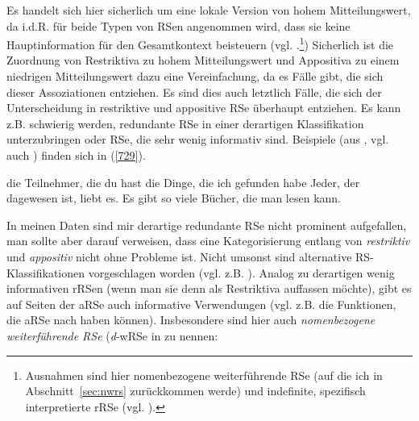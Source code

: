 Es handelt sich hier sicherlich um eine lokale Version von hohem Mitteilungs\-wert, da i.d.R. für beide Typen von RSen angenommen wird, dass sie keine Hauptinformation für den Gesamtkontext beisteuern (vgl. \citealt[38-42]{Antomo2015}.\footnote{Ausnahmen sind hier nomenbezogene weiterführende RSe (auf die ich in Abschnitt~\ref{sec:nwrs} zurückkommen werde) und indefinite, spezifisch interpretierte rRSe (vgl. \citealt[41-42]{Antomo2015}).}) Sicherlich ist die Zuordnung von Restriktiva zu hohem Mitteilungswert und Appositiva zu einem niedrigen Mitteilungswert dazu eine Vereinfachung, da es Fälle gibt, die sich dieser Assoziationen entziehen. Es sind dies auch letztlich Fälle, die sich der Unterscheidung in restriktive und appositive RSe überhaupt entziehen. Es kann z.B. schwierig werden, redundante RSe in einer derartigen Klassifikation unterzubringen oder RSe, die sehr wenig informativ sind. Beispiele (aus \citealt[14/17/33]{Weinert2004}, vgl. auch \citeyear[28-38]{Weinert2004}) finden sich in (\ref{729}).

\begin{exe}
	\ex\label{729} 
		\begin{xlist}	
			\ex\label{729a} die Teilnehmer, die du hast
			\ex\label{729b} die Dinge, die ich gefunden habe
			\ex\label{729c} Jeder, der dagewesen ist, liebt es.
			\ex\label{729d} Es gibt so viele Bücher, die man lesen kann.
		\end{xlist}
\end{exe}	
In meinen Daten sind mir derartige redundante RSe nicht prominent aufgefallen, man sollte aber darauf verweisen, dass eine Kategorisierung entlang von \textit{restriktiv} und \textit{appositiv} nicht ohne Probleme ist. Nicht umsonst sind alternative RS-Klassifikationen vorgeschlagen worden (vgl. z.B. \citealt[301-302]{Fox1990}). Analog zu derartigen wenig informativen rRSen (wenn man sie denn als Restriktiva auffassen möchte), gibt es auf Seiten der aRSe auch informative Verwendungen (vgl. z.B. die Funktionen, die aRSe nach \citealt{Loetscher1998} haben können). Insbesondere sind hier auch \textit{nomenbezogene weiterführende RSe}  (\textit{d}-wRSe in \citealt{Holler2005} zu nennen:

